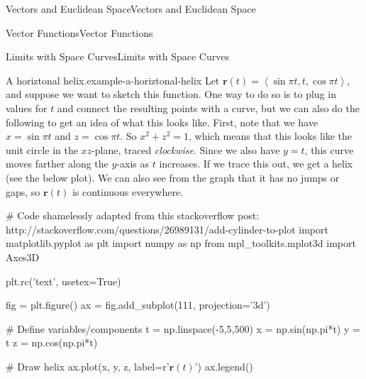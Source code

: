 \documentclass[10pt,]{book}
\numberwithin{equation}{section}
\newcommand{\vv}[1]{\mathbf{#1}}
\newcommand{\dotprod}[1]{\left\langle #1 \right\rangle}
\begin{document}
\begin{chapterptx}{Vectors and Euclidean Space}{}{Vectors and Euclidean Space}{}{}
\begin{sectionptx}{Vector Functions}{}{Vector Functions}{}{}
\begin{subsectionptx}{Limits with Space Curves}{}{Limits with Space Curves}{}{}
\begin{example}{A horiztonal helix.}{example-a-horiztonal-helix}
\hypertarget{p-1040}{}%
Let \(\vv{r}(t) = \dotprod{\sin\pi t, t, \cos\pi t}\), and suppose we want to sketch this function. One way to do so is to plug in values for \(t\) and connect the resulting points with a curve, but we can also do the following to get an idea of what this looks like. First, note that we have \(x = \sin\pi t\) and \(z=\cos\pi t\). So \(x^{2}+z^{2} = 1\), which means that this looks like the unit circle in the \(xz\)-plane, traced \emph{clockwise}. Since we also have \(y=t\), this curve moves farther along the \(y\)-axis as \(t\) increases. If we trace this out, we get a helix (see the below plot). We can also see from the graph that it has no jumps or gaps, so \(\vv{r}(t)\) is continuous everywhere.%
\end{example}
\begin{sageinput}
# Code shamelessly adapted from this stackoverflow post: http://stackoverflow.com/questions/26989131/add-cylinder-to-plot
import matplotlib.pyplot as plt
import numpy as np
from mpl_toolkits.mplot3d import Axes3D

plt.rc('text', usetex=True)

fig = plt.figure()
ax = fig.add_subplot(111, projection='3d')

# Define variables/components
t = np.linspace(-5,5,500)
x = np.sin(np.pi*t)
y = t
z = np.cos(np.pi*t)

# Draw helix
ax.plot(x, y, z, label=r'$\mathbf{r}(t)$')
ax.legend()


\end{sageinput}
\end{subsectionptx}
\end{sectionptx}
\end{chapterptx}
\end{document}
